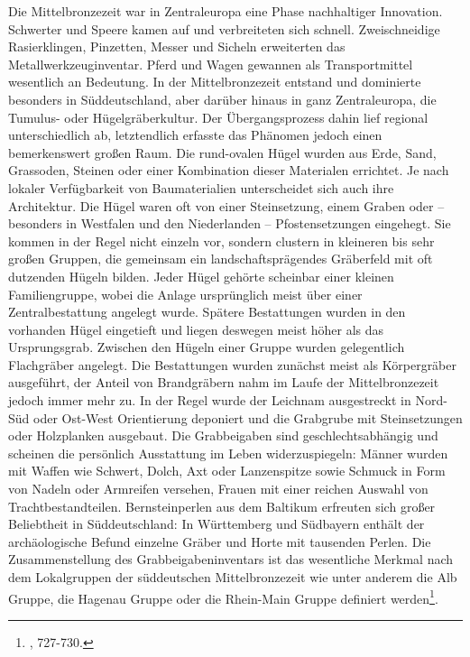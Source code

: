 \documentclass[openany,twoside,twocolumn]{book}
\let\rmarkdownfootnote\footnote%
\def\footnote{\protect\rmarkdownfootnote}
\begin{document}
Die Mittelbronzezeit war in Zentraleuropa eine Phase nachhaltiger
Innovation. Schwerter und Speere kamen auf und verbreiteten sich
schnell. Zweischneidige Rasierklingen, Pinzetten, Messer und Sicheln
erweiterten das Metallwerkzeuginventar. Pferd und Wagen gewannen als
Transportmittel wesentlich an Bedeutung. In der Mittelbronzezeit
entstand und dominierte besonders in Süddeutschland, aber darüber hinaus
in ganz Zentraleuropa, die Tumulus- oder Hügelgräberkultur. Der
Übergangsprozess dahin lief regional unterschiedlich ab, letztendlich
erfasste das Phänomen jedoch einen bemerkenswert großen Raum. Die
rund-ovalen Hügel wurden aus Erde, Sand, Grassoden, Steinen oder einer
Kombination dieser Materialen errichtet. Je nach lokaler Verfügbarkeit
von Baumaterialien unterscheidet sich auch ihre Architektur. Die Hügel
waren oft von einer Steinsetzung, einem Graben oder -- besonders in
Westfalen und den Niederlanden -- Pfostensetzungen eingehegt. Sie kommen
in der Regel nicht einzeln vor, sondern clustern in kleineren bis sehr
großen Gruppen, die gemeinsam ein landschaftsprägendes Gräberfeld mit
oft dutzenden Hügeln bilden. Jeder Hügel gehörte scheinbar einer kleinen
Familiengruppe, wobei die Anlage ursprünglich meist über einer
Zentralbestattung angelegt wurde. Spätere Bestattungen wurden in den
vorhanden Hügel eingetieft und liegen deswegen meist höher als das
Ursprungsgrab. Zwischen den Hügeln einer Gruppe wurden gelegentlich
Flachgräber angelegt. Die Bestattungen wurden zunächst meist als
Körpergräber ausgeführt, der Anteil von Brandgräbern nahm im Laufe der
Mittelbronzezeit jedoch immer mehr zu. In der Regel wurde der Leichnam
ausgestreckt in Nord-Süd oder Ost-West Orientierung deponiert und die
Grabgrube mit Steinsetzungen oder Holzplanken ausgebaut. Die
Grabbeigaben sind geschlechtsabhängig und scheinen die persönlich
Ausstattung im Leben widerzuspiegeln: Männer wurden mit Waffen wie
Schwert, Dolch, Axt oder Lanzenspitze sowie Schmuck in Form von Nadeln
oder Armreifen versehen, Frauen mit einer reichen Auswahl von
Trachtbestandteilen. Bernsteinperlen aus dem Baltikum erfreuten sich
großer Beliebtheit in Süddeutschland: In Württemberg und Südbayern
enthält der archäologische Befund einzelne Gräber und Horte mit
tausenden Perlen. Die Zusammenstellung des Grabbeigabeninventars ist das
wesentliche Merkmal nach dem Lokalgruppen der süddeutschen
Mittelbronzezeit wie unter anderem die Alb Gruppe, die Hagenau Gruppe
oder die Rhein-Main Gruppe definiert werden\footnote{\textcite{jockenhovel_germany_2013},
  727-730.}.
\end{document}

